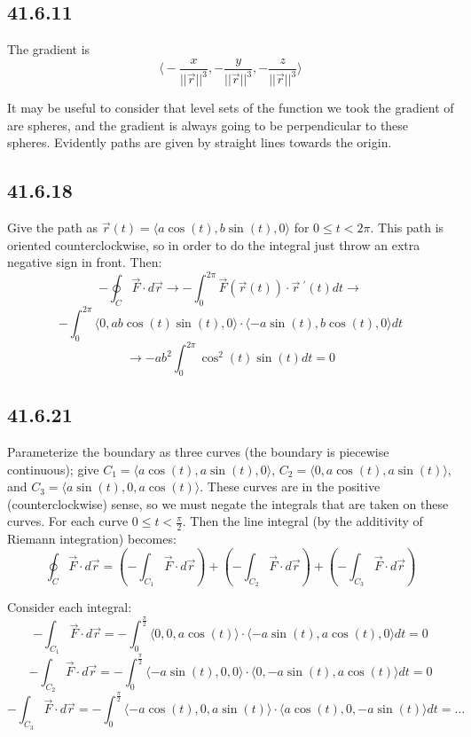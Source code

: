 \documentclass{article}
\begin{document}
\subsection{41.6.11}

The gradient is $$\bigg\langle -\frac{x}{||\vec{r}||^3},-\frac{y}{||\vec{r}||^3}, -\frac{z}{||\vec{r}||^3} \bigg\rangle$$

It may be useful to consider that level sets of the function we took the gradient of are spheres, and the gradient is always going to be perpendicular to these spheres. Evidently paths are given by straight lines towards the origin.

\subsection{41.6.18}

Give the path as $\vec{r}(t) = \langle a\cos(t),b\sin(t),0 \rangle$ for $0\leq t < 2\pi$. This path is oriented counterclockwise, so in order to do the integral just throw an extra negative sign in front. Then:
$$-\oint_C \vec{F}\cdot d\vec{r} \to -\int_0^{2\pi} \vec{F}(\vec{r}(t))\cdot \vec{r}~^{\prime}(t)dt \to$$
$$ -\int_0^{2\pi} \langle 0, ab\cos(t)\sin(t) ,0 \rangle \cdot \langle -a\sin(t),b\cos(t) ,0 \rangle dt$$
$$ \to -ab^2\int_0^{2\pi}\cos^2(t)\sin(t)dt = 0$$

\subsection{41.6.21}

Parameterize the boundary as three curves (the boundary is piecewise continuous); give $C_1 = \langle a\cos(t),a\sin(t) ,0 \rangle$, $C_2 = \langle 0,a\cos(t) ,a\sin(t) \rangle$, and $C_3 = \langle a\sin(t),0 ,a\cos(t) \rangle$. These curves are in the positive (counterclockwise) sense, so we must negate the integrals that are taken on these curves. For each curve $0\leq t < \frac{\pi}{2}$. Then the line integral (by the additivity of Riemann integration) becomes:
$$\oint_C \vec{F}\cdot d\vec{r}= \left(-\int_{C_1} \vec{F}\cdot d\vec{r}\right) + \left(-\int_{C_2} \vec{F}\cdot d\vec{r}\right) + \left(-\int_{C_3} \vec{F}\cdot d\vec{r}\right)$$

Consider each integral:
$$-\int_{C_1} \vec{F}\cdot d\vec{r} = -\int_0^{\frac{\pi}{2}} \langle 0, 0 ,a\cos(t) \rangle \cdot \langle -a\sin(t), a\cos(t) ,0 \rangle dt = 0$$
$$-\int_{C_2} \vec{F}\cdot d\vec{r} = -\int_0^{\frac{\pi}{2}} \langle -a\sin(t), 0 ,0 \rangle \cdot \langle 0, -a\sin(t) ,a\cos(t) \rangle dt = 0$$
$$-\int_{C_3} \vec{F}\cdot d\vec{r} = -\int_0^{\frac{\pi}{2}} \langle -a\cos(t), 0 ,a\sin(t) \rangle \cdot \langle a\cos(t), 0 ,-a\sin(t) \rangle dt = \dots$$
\end{document}
